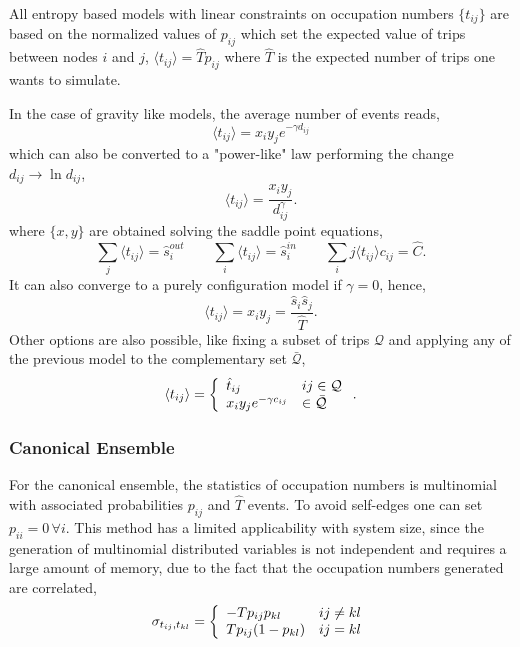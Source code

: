 \documentclass[aps,floatfix,noshowpacs,superscriptaddress]{revtex4}
\begin{document}
All entropy based models with linear constraints on occupation numbers $\{t_{ij} \}$ are based on the normalized values of $p_{ij}$ which set the expected value of trips between nodes $i$ and $j$, $\langle t_{ij} \rangle = \hat{T}p_{ij}$ where $\hat{T}$ is the expected number of trips one wants to simulate.

In the case of gravity like models, the average number of events reads,
\[
\langle t_{ij} \rangle = x_i y_j e^{-\gamma d_{ij}}
\]
which can also be converted to a "power-like" law performing the change $d_{ij} \to \ln d_{ij}$,
\[
\langle t_{ij} \rangle = \frac{x_i y_j}{d_{ij}^{\gamma}}.
\]
where $\{x,y\}$ are obtained solving the saddle point equations,
\[
\sum_j \langle t_{ij} \rangle = \hat{s}_i^{out} \qquad \sum_i \langle t_{ij} \rangle = \hat{s}_i^{in} \qquad \sum_ij \langle t_{ij} \rangle c_{ij} = \hat{C}.  
\]
It can also converge to a purely configuration model if $\gamma  = 0$, hence,
\[
\langle t_{ij} \rangle = x_i y_j = \frac{\hat{s}_i \hat{s}_j}{\hat{T}}.
\]
Other options are also possible, like fixing a subset of trips $\mathcal{Q}$ and applying any of the previous model to the complementary set $\bar{\mathcal{Q}}$,
\[
\langle t_{ij} \rangle = \left \{ \begin{array}{l l} 
\hat{t}_{ij} & ij \in \mathcal{Q} \\
x_i y_j e^{-\gamma c_{ij}} & \in \bar{\mathcal{Q}}
\end{array} \right. .
\]


\subsubsection{Canonical Ensemble}
For the canonical ensemble, the statistics of occupation numbers is multinomial with associated probabilities $p_{ij}$ and $\hat{T}$ events. 
To avoid self-edges one can set $p_{ii} = 0 \, \forall i$. This method has a limited applicability with system size, since the generation of multinomial distributed variables is not independent and requires a large amount of memory, due to the fact that the occupation numbers generated are correlated,
\begin{equation}
\sigma_{t_{ij},t_{kl}} = \left \{ \begin{array}{l l} - Tp_{ij} p_{kl} & ij\neq kl \\ Tp_{ij} (1-p_{kl}) & ij=kl  \end{array} \right.
\end{equation}
\end{document}
